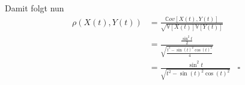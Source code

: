\documentclass[a4paper,11pt,notitlepage,fullpage]{article}
\newcommand{\Vv}[1]{\mathbb V\left[#1\right]}
\newcommand{\Cov}[1]{\mathbb Cov\left[#1\right]}
\begin{document}
\begin{enumerate}
Damit folgt nun
\begin{align*}
\rho(X(t), Y(t)) &= \frac{\Cov{X(t), Y(t)}}{\sqrt{\Vv{X(t)}\Vv{Y(t)}}} \\
&= \frac{\frac{\sin^2t}{2}}{\sqrt{ \frac{t^2 - \sin(t)^2\cos(t)^2}{4} }} \\
&= \frac{\sin^2t}{\sqrt{ t^2 - \sin(t)^2\cos(t)^2}}  &\square\\
\end{align*}








\end{enumerate}
\end{document}
